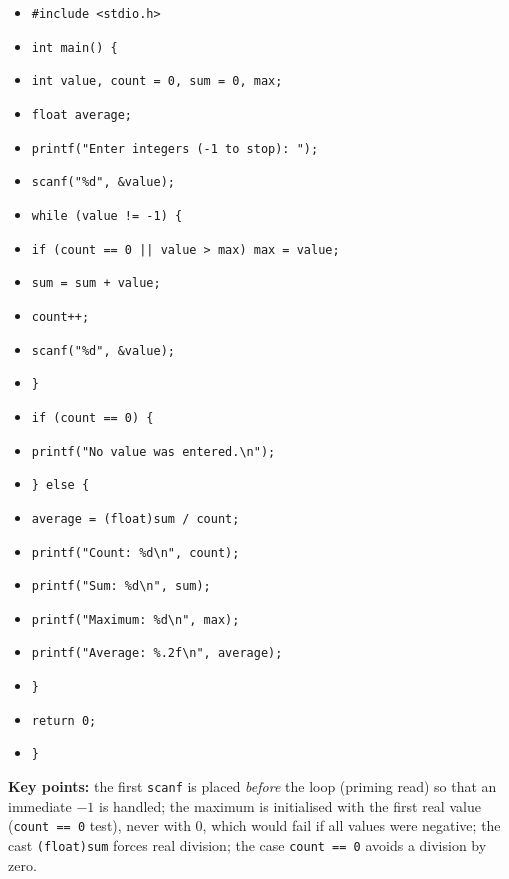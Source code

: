 \documentclass[11pt]{article}
\begin{document}
\begin{corrige}
\begin{itemize}
\item \texttt{\#include <stdio.h>}
\item \texttt{int main() \{}
\item \texttt{\quad int value, count = 0, sum = 0, max;}
\item \texttt{\quad float average;}
\item \texttt{\quad printf("Enter integers (-1 to stop): ");}
\item \texttt{\quad scanf("\%d", \&value);}
\item \texttt{\quad while (value != -1) \{}
\item \texttt{\quad\quad if (count == 0 || value > max) max = value;}
\item \texttt{\quad\quad sum = sum + value;}
\item \texttt{\quad\quad count++;}
\item \texttt{\quad\quad scanf("\%d", \&value);}
\item \texttt{\quad \}}
\item \texttt{\quad if (count == 0) \{}
\item \texttt{\quad\quad printf("No value was entered.\textbackslash n");}
\item \texttt{\quad \} else \{}
\item \texttt{\quad\quad average = (float)sum / count;}
\item \texttt{\quad\quad printf("Count: \%d\textbackslash n", count);}
\item \texttt{\quad\quad printf("Sum: \%d\textbackslash n", sum);}
\item \texttt{\quad\quad printf("Maximum: \%d\textbackslash n", max);}
\item \texttt{\quad\quad printf("Average: \%.2f\textbackslash n", average);}
\item \texttt{\quad \}}
\item \texttt{\quad return 0;}
\item \texttt{\}}
\end{itemize}
\textbf{Key points:} the first \texttt{scanf} is placed \emph{before} the loop (priming read) so that an immediate $-1$ is handled; the maximum is initialised with the first real value (\texttt{count == 0} test), never with $0$, which would fail if all values were negative; the cast \texttt{(float)sum} forces real division; the case \texttt{count == 0} avoids a division by zero.
\end{corrige}
\end{document}
